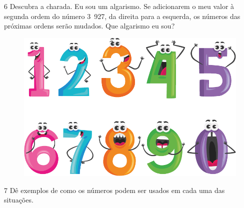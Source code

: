 \pagebreak


\num{6} Descubra a charada. Eu sou um algarismo. Se adicionarem o meu valor à
segunda ordem do número 3~927, da direita para a esquerda, os números das próximas
ordens serão mudados. Que algarismo eu sou?


\begin{figure}[htpb!]
\includegraphics[width=\textwidth]{./media/image8.png}
\end{figure}

\pagebreak
\num{7} Dê exemplos de como os números podem ser usados em cada uma das
situações.

\vspace{+2em}

